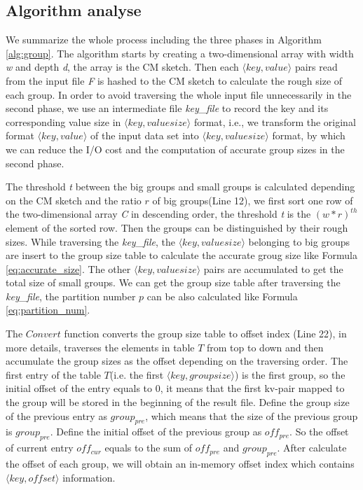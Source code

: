 \subsection{Algorithm analyse}
We summarize the whole process including the three phases in Algorithm \ref{alg:group}. The algorithm starts by creating a two-dimensional array with width \emph{w} and depth \emph{d}, the array is the CM sketch. Then each $\langle key, value\rangle$ pairs read from the input file \emph{F} is hashed to the CM sketch to calculate the rough size of each group. In order to avoid traversing the whole input file unnecessarily in the second phase, we use an intermediate file \emph{key\_file} to record the key and its corresponding value size in $\langle key, valuesize\rangle$ format, i.e., we transform the original format $\langle key, value\rangle$ of the input data set into $\langle key, valuesize\rangle$ format, by which we can reduce the I/O cost and the computation of accurate group sizes in the second phase.

The threshold \emph{t} between the big groups and small groups is calculated depending on the CM sketch and the ratio $r$ of big groups(Line 12), we first sort one row of the two-dimensional array \emph{C} in descending order, the threshold \emph{t} is the ${(w*r)}^{th}$ element of the sorted row. Then the groups can be distinguished by their rough sizes. While traversing the \emph{key\_file}, the $\langle key, valuesize\rangle$ belonging to big groups are insert to the group size table to calculate the accurate groug size like Formula \ref{eq:accurate_size}. The other $\langle key, valuesize\rangle$ pairs are accumulated to get the total size of small groups. We can get the group size table after traversing the \emph{key\_file}, the partition number $p$ can be also calculated like Formula \ref{eq:partition_num}.

The $Convert$ function converts the group size table to offset index (Line 22), in more details, traverses the elements in table $T$ from top to down and then accumulate the group sizes as the offset depending on the traversing order. The first entry of the table $T$(i.e. the first $\langle key, groupsize\rangle$) is the first group, so the initial offset of the entry equals to 0, it means that the first kv-pair mapped to the group will be stored in the beginning of the result file. Define the group size of the previous entry as $group_{pre}$, which means that the size of the previous group is $group_{pre}$. Define the initial offset of the previous group as ${off}_{pre}$. So the offset of current entry ${off}_{cur}$ equals to the sum of ${off}_{pre}$ and $group_{pre}$. After calculate the offset of each group, we will obtain an in-memory offset index which contains $\langle key,offset\rangle$ information. 

